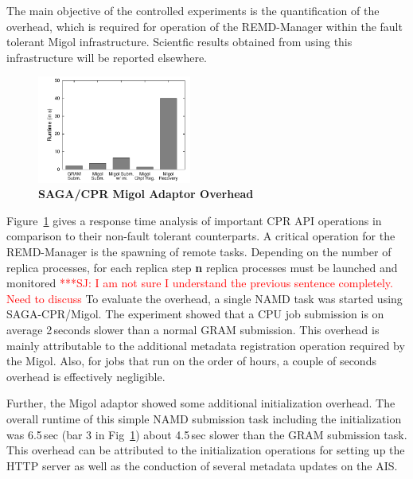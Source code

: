 \documentclass[times, 10pt, twocolumn]{article}
\newcommand{\jhanote}[1]{ {\textcolor{red} { ***SJ: #1 }}}
\newcommand{\jhanote}[1]{}
\begin{document}
  The main objective of the controlled experiments is the
  quantification of the overhead, which is required for operation of
  the REMD-Manager within the fault tolerant Migol infrastructure.
  Scientfic results obtained from using this infrastructure will be 
  reported elsewhere.
\begin{figure}[ht]
    \centering
        \includegraphics[width=0.45\textwidth]{performance/perf_submission.pdf}
    \caption{\small \bf SAGA/CPR Migol Adaptor Overhead}
    \label{fig:performance_perf_submission}
\end{figure}           
Figure~\ref{fig:performance_perf_submission} gives a response time
analysis of important CPR API operations in comparison to their
non-fault tolerant counterparts. A critical operation for the
REMD-Manager is the spawning of remote tasks. Depending on the number
of replica processes, for each replica step {\bf n} replica processes
must be launched and monitored \jhanote{I am not sure I understand the
  previous sentence completely. Need to discuss} To evaluate the
overhead, a single NAMD task was started using SAGA-CPR/Migol.  The
experiment showed that a CPU job submission is on average 2\,seconds
slower than a normal GRAM submission. This overhead is mainly
attributable to the additional metadata registration operation
required by the Migol. Also, for jobs that run on the order of hours,
a couple of seconds overhead is effectively negligible.

Further, the Migol adaptor showed some additional initialization
overhead.  The overall runtime of this simple NAMD submission task
including the initialization was 6.5\,sec (bar 3 in
Fig~\ref{fig:performance_perf_submission}) about 4.5\,sec slower
than the GRAM submission task. This overhead can be attributed to the
initialization operations for setting up the HTTP server as well as
the conduction of several metadata updates on the AIS.
                                                                                                                    
\end{document}
